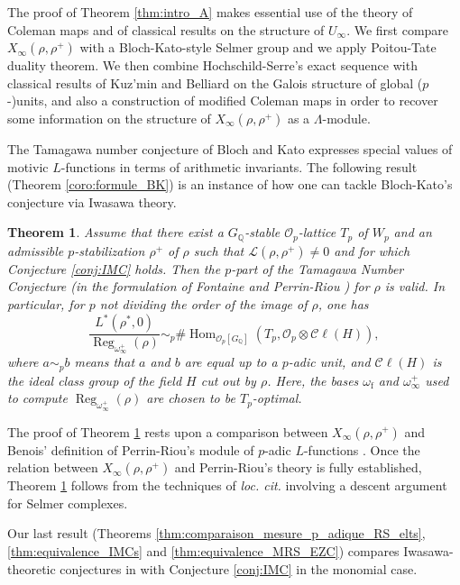\documentclass[12pt]{amsart}
\newcommand\bQ{\mathbb{Q}}
\newcommand\cL{\mathcal{L}}
\newcommand\cO{\mathcal{O}}
\DeclareMathOperator{\Hom}{Hom}
\DeclareMathOperator{\Reg}{Reg}
\newcommand{\ff}{\mathrm{f}}
\theoremstyle{defstyle}
\theoremstyle{thmstyle}
\newtheorem{THM}{Theorem}
\begin{document}
The proof of Theorem \ref{thm:intro_A} makes essential use of the theory of Coleman maps \cite{coleman} and of classical results on the structure of $U_\infty$. 
We first compare $X_\infty(\rho,\rho^+)$ with a Bloch-Kato-style Selmer group and we apply Poitou-Tate duality theorem. We then combine Hochschild-Serre's exact sequence with classical results of Kuz'min \cite{kuzmin} and Belliard \cite{belliard} on the Galois structure of global ($p$-)units, and also a construction of modified Coleman maps in order to recover some information on the structure of $X_\infty(\rho,\rho^+)$ as a $\Lambda$-module.


The Tamagawa number conjecture of Bloch and Kato \cite{blochkato} expresses special values of motivic $L$-functions in terms of arithmetic invariants. The following result (Theorem \ref{coro:formule_BK}) is an instance of how one can tackle Bloch-Kato's conjecture via Iwasawa theory.

\begin{THM}\label{thm:intro_B}
	Assume that there exist a $G_{\bQ}$-stable $\cO_p$-lattice $T_p$ of $W_p$ and an admissible $p$-stabilization $\rho^+$ of $\rho$ such that $\cL(\rho,\rho^+)\neq 0$ and for which Conjecture \ref{conj:IMC} holds. Then the $p$-part of the Tamagawa Number Conjecture (in the formulation of Fontaine and Perrin-Riou \cite{fontaineperrinriou}) for $\rho$ is valid. In particular, for $p$ not dividing the order of the image of $\rho$, one has 
	$$\dfrac{L^{*}\left(\rho^*,0\right)}{\Reg_{\omega_\infty^+}(\rho)}  \sim_p \#\Hom_{\cO_p[G_{\bQ}]}(T_p,\cO_p \otimes\mathscr{C}\!\ell(H)),$$
	where $a\sim_p b$ means that $a$ and $b$ are equal up to a $p$-adic unit, and  $\mathscr{C}\!\ell(H)$ is the ideal class group of the field $H$ cut out by $\rho$. Here, the bases $\omega_{\ff}$ and $\omega_\infty^+$ used to compute $\Reg_{\omega_\infty^+}(\rho)$ are chosen to be $T_p$-optimal.
\end{THM}

The proof of Theorem \ref{thm:intro_B} rests upon a comparison between $X_\infty(\rho,\rho^+)$ and Benois' definition of Perrin-Riou's module of $p$-adic $L$-functions \cite{benoiscrys}. Once the relation between $X_\infty(\rho,\rho^+)$ and Perrin-Riou's theory is fully established, Theorem \ref{thm:intro_B} follows from the techniques of \textit{loc. cit.} involving a descent argument for Selmer complexes.

Our last result (Theorems \ref{thm:comparaison_mesure_p_adique_RS_elts}, \ref{thm:equivalence_IMCs} and \ref{thm:equivalence_MRS_EZC}) compares Iwasawa-theoretic conjectures in \cite[§3-4]{BKSANT} with Conjecture \ref{conj:IMC} in the monomial case.  
\end{document}
